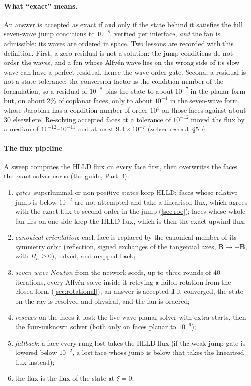 \documentclass[11pt,a4paper,oneside,openany]{book}
\theoremstyle{definition}
\theoremstyle{plain}
\theoremstyle{remark}
\newcommand{\BB}{\bm{B}}
\begin{document}
\paragraph{What ``exact'' means.} An answer is accepted as exact if and only if the state
behind it satisfies the full seven-wave jump conditions to $10^{-8}$, verified per
interface, \emph{and} the fan is admissible: its waves are ordered in space. Two lessons are
recorded with this definition. First, a zero residual is not a solution: the jump
conditions do not order the waves, and a fan whose Alfvén wave lies on the wrong side of its
slow wave can have a perfect residual, hence the wave-order gate. Second, a residual is not
a state tolerance: the conversion factor is the condition number of the formulation, so a
residual of $10^{-8}$ pins the state to about $10^{-7}$ in the planar form but, on about 2\%
of coplanar faces, only to about $10^{-4}$ in the seven-wave form, whose Jacobian has a
condition number of order $10^4$ on those faces against about $30$ elsewhere. Re-solving
accepted faces at a tolerance of $10^{-12}$ moved the flux by a
median of $10^{-12}$--$10^{-11}$ and at most $9.4\times10^{-7}$ (solver record, \S5b).

\paragraph{The flux pipeline.} A sweep computes the HLLD flux on every face first, then
overwrites the faces the exact solver earns (the guide, Part~4):
\begin{enumerate}[nosep]
\item \emph{gates}: superluminal or non-positive states keep HLLD; faces whose relative jump
  is below $10^{-2}$ are not attempted and take a linearised flux, which agrees with the
  exact flux to second order in the jump (\cref{sec:roe}); faces whose whole fan lies on one
  side keep the HLLD flux, which is then the exact upwind flux;
\item \emph{canonical orientation}: each face is replaced by the canonical member of its
  symmetry orbit (reflection, signed exchanges of the tangential axes, $\BB\to-\BB$, with
  $B_n\ge0$), solved, and mapped back;
\item \emph{seven-wave Newton} from the network seeds, up to three rounds of 40
  iterations, every Alfvén solve inside it retrying a failed rotation from the closed form
  (\cref{sec:rotational}); an answer is accepted if it converged, the state on the ray is
  resolved and physical, and the fan is ordered;
\item \emph{rescues} on the faces it lost: the five-wave planar solver with extra starts,
  then the four-unknown solver (both only on faces planar to $10^{-6}$);
\item \emph{fallback}: a face every rung lost takes the HLLD flux (if the weak-jump gate is
  lowered below $10^{-2}$, a lost face whose jump is below that takes the linearised flux
  instead);
\item the flux is the flux of the state at $\xi=0$.
\end{enumerate}
\end{document}
